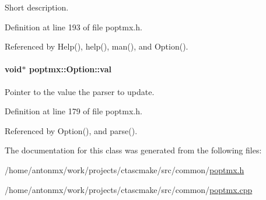 Short description. 



Definition at line 193 of file poptmx.h.



Referenced by Help(), help(), man(), and Option().

\hypertarget{classpoptmx_1_1Option_a8bf55fc70387f6c8929538f420d99658}{
\paragraph[{val}]{\setlength{\rightskip}{0pt plus 5cm}void$\ast$ {\bf poptmx::Option::val}}\hfill}
\label{classpoptmx_1_1Option_a8bf55fc70387f6c8929538f420d99658}


Pointer to the value the parser to update. 



Definition at line 179 of file poptmx.h.



Referenced by Option(), and parse().



The documentation for this class was generated from the following files:\begin{DoxyCompactItemize}
\item 
/home/antonmx/work/projects/ctascmake/src/common/\hyperlink{poptmx_8h}{poptmx.h}\item 
/home/antonmx/work/projects/ctascmake/src/common/\hyperlink{poptmx_8cpp}{poptmx.cpp}\end{DoxyCompactItemize}

